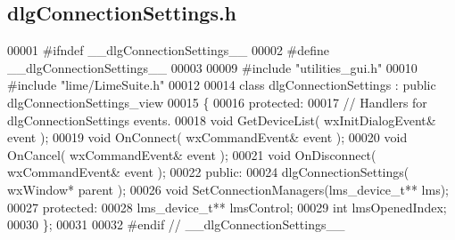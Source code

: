 \subsection{dlg\+Connection\+Settings.\+h}
\label{dlgConnectionSettings_8h_source}

\begin{DoxyCode}
00001 \textcolor{preprocessor}{#ifndef \_\_dlgConnectionSettings\_\_}
00002 \textcolor{preprocessor}{#define \_\_dlgConnectionSettings\_\_}
00003 
00009 \textcolor{preprocessor}{#include "utilities_gui.h"}
00010 \textcolor{preprocessor}{#include "lime/LimeSuite.h"}
00012 
00014 \textcolor{keyword}{class }dlgConnectionSettings : \textcolor{keyword}{public} dlgConnectionSettings_view
00015 \{
00016     \textcolor{keyword}{protected}:
00017         \textcolor{comment}{// Handlers for dlgConnectionSettings events.}
00018         \textcolor{keywordtype}{void} GetDeviceList( wxInitDialogEvent& event );
00019         \textcolor{keywordtype}{void} OnConnect( wxCommandEvent& event );
00020         \textcolor{keywordtype}{void} OnCancel( wxCommandEvent& event );
00021         \textcolor{keywordtype}{void} OnDisconnect( wxCommandEvent& event );
00022     \textcolor{keyword}{public}:
00024         dlgConnectionSettings( wxWindow* parent );
00026         \textcolor{keywordtype}{void} SetConnectionManagers(lms_device_t** lms);
00027     \textcolor{keyword}{protected}:
00028         lms_device_t** lmsControl;
00029         \textcolor{keywordtype}{int} lmsOpenedIndex;
00030 \};
00031 
00032 \textcolor{preprocessor}{#endif // \_\_dlgConnectionSettings\_\_}
\end{DoxyCode}
